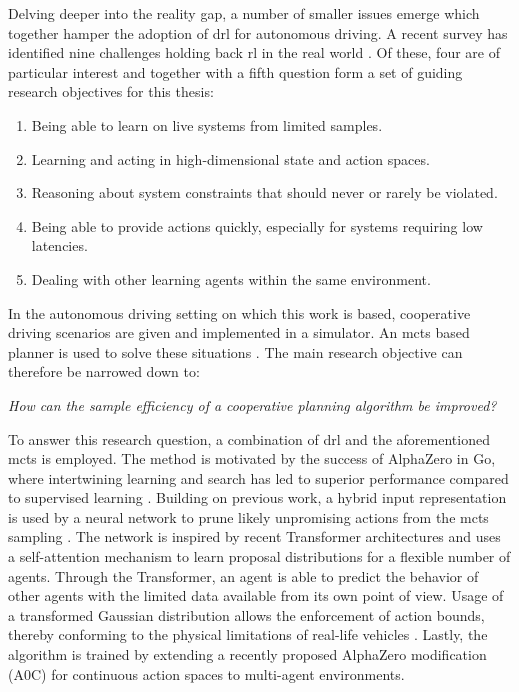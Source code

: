 Delving deeper into the reality gap, a number of smaller issues emerge which together hamper the adoption of \gls{drl} for autonomous driving. A recent survey has identified nine challenges holding back \gls{rl} in the real world \cite{dulac-arnoldEmpiricalInvestigationChallenges2021}. Of these, four are of particular interest and together with a fifth question form a set of guiding research objectives for this thesis:
\begin{enumerate}
    \item Being able to learn on live systems from limited samples.
    \item Learning and acting in high-dimensional state and action spaces. 
    \item Reasoning about system constraints that should never or rarely be violated.
    \item Being able to provide actions quickly, especially for systems requiring low latencies.
    \item Dealing with other learning agents within the same environment.
\end{enumerate}
In the autonomous driving setting on which this work is based, cooperative driving scenarios are given and implemented in a simulator. An \gls{mcts} based planner is used to solve these situations \cite{kurzerDecentralizedCooperativePlanning2018}. The main research objective can therefore be narrowed down to:

\indent \emph{How can the sample efficiency of a cooperative planning algorithm be improved?}

To answer this research question, a combination of \gls{drl} and the aforementioned \gls{mcts} is employed. The method is motivated by the success of AlphaZero in Go, where intertwining learning and search has led to superior performance compared to supervised learning \cite{silverMasteringGameGo2016, silverMasteringGameGo2017}. Building on previous work, a hybrid input representation is used by a neural network to prune likely unpromising actions from the \gls{mcts} sampling \cite{kurzerAcceleratingCooperativePlanning2020}. The network is inspired by recent Transformer architectures \cite{vaswaniAttentionAllYou2017, devlinBERTPretrainingDeep2019, dosovitskiyIMAGEWORTH16X162021a} and uses a self-attention mechanism to learn proposal distributions for a flexible number of agents. Through the Transformer, an agent is able to predict the behavior of other agents with the limited data available from its own point of view. Usage of a transformed Gaussian distribution allows the enforcement of action bounds, thereby conforming to the physical limitations of real-life vehicles \cite{haarnojaSoftActorCriticAlgorithms2018}. Lastly, the algorithm is trained by extending a recently proposed AlphaZero modification (A0C) for continuous action spaces \cite{moerlandA0CAlphaZero2018} to multi-agent environments.

